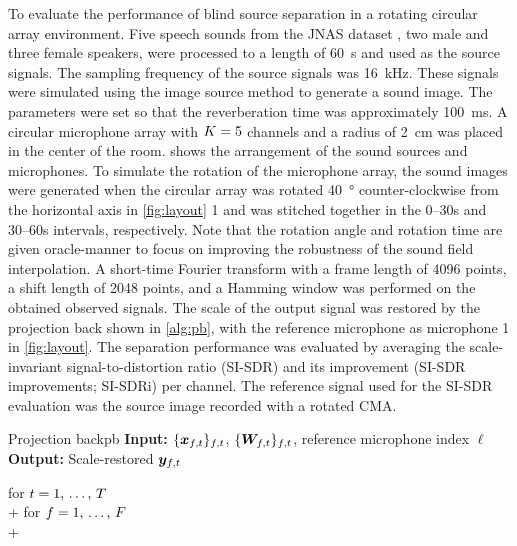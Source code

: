 \documentclass[sip,biber]{now-journal}
\begin{document}
To evaluate the performance of blind source separation in a rotating circular array environment.
Five speech sounds from the JNAS dataset \cite{Itou:1999:AST}, two male and three female speakers, were processed to a length of \SI{60}{\second} and used as the source signals.
The sampling frequency of the source signals was \SI{16}{\kilo\hertz}.
These signals were simulated using the image source method \cite{Allen:1979:JASA} to generate a sound image.
The parameters were set so that the reverberation time was approximately \SI{100}{\milli\second}.
A circular microphone array with $K = 5$ channels and a radius of \SI{2}{\centi\metre} was placed in the center of the room.
 shows the arrangement of the sound sources and microphones.
To simulate the rotation of the microphone array, the sound images were generated when the circular array was rotated \SI{40}{\degree} counter-clockwise from the horizontal axis in \cref{fig:layout} 1 and was stitched together in the 0--30\si{\second} and 30--60\si{\second} intervals, respectively.
Note that the rotation angle and rotation time are given oracle-manner to focus on improving the robustness of the sound field interpolation.
A short-time Fourier transform with a frame length of 4096 points, a shift length of 2048 points, and a Hamming window was performed on the obtained observed signals.
The scale of the output signal was restored by the projection back shown in \cref{alg:pb}, with the reference microphone as microphone 1 in \cref{fig:layout}.
The separation performance was evaluated by averaging the scale-invariant signal-to-distortion ratio (SI-SDR) \cite{LeRoux:2019:ICASSP} and its improvement (SI-SDR improvements; SI-SDRi) per channel.
The reference signal used for the SI-SDR evaluation was the source image recorded with a rotated CMA.
\begin{algorithm}{Projection back}{pb}
  \textbf{Input:} $\{\Obs _{\ft}\} _{\ft}$, $\{\Demix _{\ft}\} _{\ft}$, reference microphone index $\ell$\\
  \textbf{Output:} Scale-restored $\Est _{\ft}$
  \begin{pseudo}
    for $t = 1,\, \dots,\, T$ \\+
      for $f = 1,\, \dots,\, F$ \\+
         \\
  \end{pseudo}
\end{algorithm}
\end{document}
